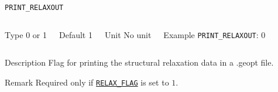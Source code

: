 \documentclass[xcolor=dvipsnames,t]{beamer}
\begin{document}
\begin{frame}[allowframebreaks]{\texttt{PRINT\_RELAXOUT}} \label{PRINT_RELAXOUT}
\vspace*{-12pt}
\begin{columns}
\begin{block}{Type}
0 or 1
\end{block}

\begin{block}{Default}
1
\end{block}

\begin{block}{Unit}
No unit
\end{block}

\begin{block}{Example}
\texttt{PRINT\_RELAXOUT}: 0
\end{block}
\end{columns}

\begin{block}{Description}
Flag for printing the structural relaxation data in a .geopt file.
\end{block}

\begin{block}{Remark}
Required only if \hyperlink{RELAX_FLAG}{\texttt{RELAX\_FLAG}} is set to $1$.
\end{block}

\end{frame}
\end{document}
